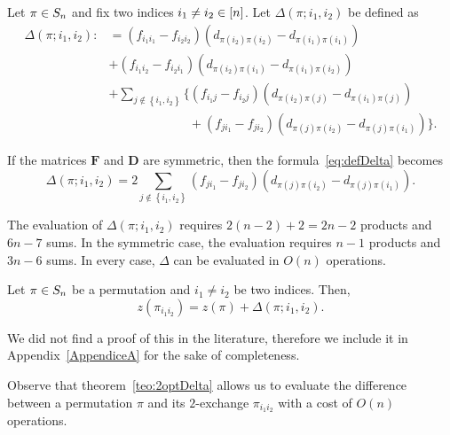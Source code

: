 \begin{defi}\label{def:Delta}
	Let $\pi \in S_n$  and fix two indices $i_1 \neq i_2 \in [n]$. 
	Let  $\Delta(\pi; i_1,i_2)$ be defined  as
	\begin{equation}\label{eq:defDelta}
	\begin{split}
	\Delta(\pi;i_1,i_2):&=\left(f_{i_1i_1}-f_{i_2i_2}\right)\left(d_{\pi(i_2)\pi(i_2)}-d_{\pi(i_1)\pi(i_1)}\right)\\
	&+\left(f_{i_1i_2}-f_{i_2i_1}\right)\left(d_{\pi(i_2)\pi(i_1)}-d_{\pi(i_1)\pi(i_2)}\right) \\
	&+\sum_{j \notin\left\{i_1,i_2\right\}} \Big\{\left(f_{i_1j}-f_{i_2j}\right)\left(d_{\pi(i_2)\pi(j)}-d_{\pi(i_1)\pi(j)}\right)\\
	&\phantom{\sum_{j \notin\left\{i_1,i_2\right\}}+}+\left(f_{j i_1}-f_{ji_2}\right)\left(d_{\pi(j)\pi(i_2)}-d_{\pi(j)\pi(i_1)}\right)\Big\}. 
	\end{split}
	\end{equation}
\end{defi}



\begin{oss}
	If the matrices $\bm F$ and $\bm D$ are symmetric, then the formula~\eqref{eq:defDelta} becomes
	\begin{equation}
	\Delta(\pi; i_1,i_2) = 2 \sum_{j \notin\left\{i_1,i_2\right\}}\left(f_{j i_1}-f_{ji_2}\right)\left(d_{\pi(j)\pi(i_2)}-d_{\pi(j)\pi(i_1)}\right).
	\end{equation}
\end{oss}
\begin{oss}
	The evaluation of $\Delta(\pi; i_1,i_2)$ requires $2(n-2)+2=2n-2$ products and $6n-7$ sums. In the symmetric case, the evaluation requires $n-1$ products and $3n-6$ sums. In every case, $\Delta$ can be evaluated in $O(n)$ operations.
\end{oss}

\begin{teo}
	\label{teo:2optDelta}
	Let $\pi \in S_n$ be a permutation and $i_1 \neq i_2$ be  two indices. Then, 
	\begin{equation}
	z(\pi_{i_1 i_2}) = z(\pi) + \Delta(\pi; i_1,i_2).
	\end{equation} 
\end{teo}
We did not find a proof of this in the literature, therefore we include it in Appendix~\ref{AppendiceA} for the sake of completeness. 


Observe that theorem~\ref{teo:2optDelta} allows us to evaluate the difference between a permutation $\pi$ and its $2$-exchange $\pi_{i_1i_2}$ with a cost of $O(n)$ operations. 


